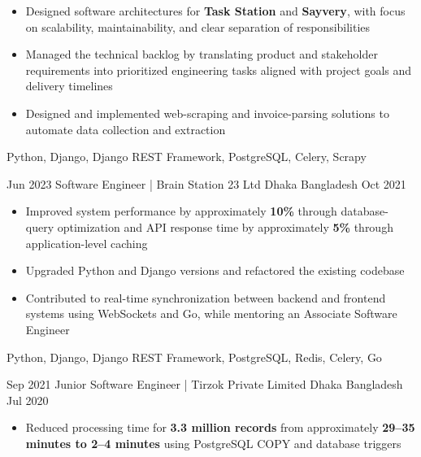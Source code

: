 \begin{experiences}
{\begin{itemize}
                \item Designed software architectures for \textbf{Task Station}
                      and \textbf{Sayvery}, with focus on scalability,
                      maintainability, and clear separation of responsibilities

                \item Managed the technical backlog by translating product and
                      stakeholder requirements into prioritized engineering tasks
                      aligned with project goals and delivery timelines

                \item Designed and implemented web-scraping and invoice-parsing
                      solutions to automate data collection and extraction
            \end{itemize}
        }
        {Python, Django, Django REST Framework, PostgreSQL, Celery, Scrapy}

    \emptySeparator


    \experience
        {Jun 2023}
        {Software Engineer | Brain Station 23 Ltd}
        {Dhaka}
        {Bangladesh}
        {Oct 2021}
        {
            \begin{itemize}
                \item Improved system performance by approximately \textbf{10\%} through
                      database-query optimization and API response time by approximately
                      \textbf{5\%} through application-level caching

                \item Upgraded Python and Django versions and refactored the existing codebase

                \item Contributed to real-time synchronization between backend
                      and frontend systems using WebSockets and Go, while mentoring
                      an Associate Software Engineer
            \end{itemize}
        }
        {Python, Django, Django REST Framework, PostgreSQL, Redis, Celery, Go}

    \emptySeparator


    \experience
        {Sep 2021}
        {Junior Software Engineer | Tirzok Private Limited}
        {Dhaka}
        {Bangladesh}
        {Jul 2020}
        {
            \begin{itemize}
                \item Reduced processing time for \textbf{3.3 million records}
                      from approximately \textbf{29--35 minutes to 2--4 minutes}
                      using PostgreSQL COPY and database triggers


\end{itemize}}
\end{experiences}
